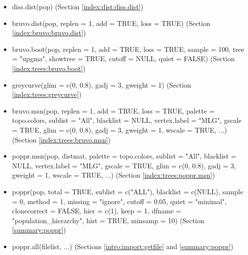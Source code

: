 \documentclass[letterpaper]{article}
\begin{document}
\begin{itemize}
\item diss.dist(pop) (Section \ref{index:dist:diss.dist})
\item bruvo.dist(pop, replen = 1, add = TRUE, loss = TRUE) (Section \ref{index:bruvo:bruvo.dist})
\item bruvo.boot(pop, replen = 1, add = TRUE, loss = TRUE, sample = 100, tree = "upgma", showtree = TRUE, cutoff = NULL, quiet = FALSE) (Section \ref{index:trees:bruvo.boot})
\item greycurve(glim = c(0, 0.8), gadj = 3, gweight = 1) (Section \ref{index:trees:greycurve})
\item bruvo.msn(pop, replen = 1, add = TRUE, loss = TRUE, palette = topo.colors, sublist = "All", blacklist = NULL, vertex.label = "MLG", gscale = TRUE, glim = c(0, 0.8), gadj = 3, gweight = 1, wscale = TRUE, ...) (Section \ref{index:trees:bruvo.msn})
\item poppr.msn(pop, distmat, palette = topo.colors, sublist = "All", blacklist = NULL, vertex.label = "MLG", gscale = TRUE, glim = c(0, 0.8), gadj = 3, gweight = 1, wscale = TRUE, ...) (Section \ref{index:trees:poppr.msn})
\item poppr(pop, total = TRUE, sublist = c("ALL"), blacklist = c(NULL), sample = 0, method = 1, missing = "ignore", cutoff = 0.05, quiet = "minimal", clonecorrect = FALSE, hier = c(1), keep = 1, dfname = "population\_hierarchy", hist = TRUE, minsamp = 10) (Section \ref{summary:poppr})
\item poppr.all(filelist, ...) (Sections \ref{intro:import:getfile} and \ref{summary:poppr})
\end{itemize}
\normalsize


\end{document}

